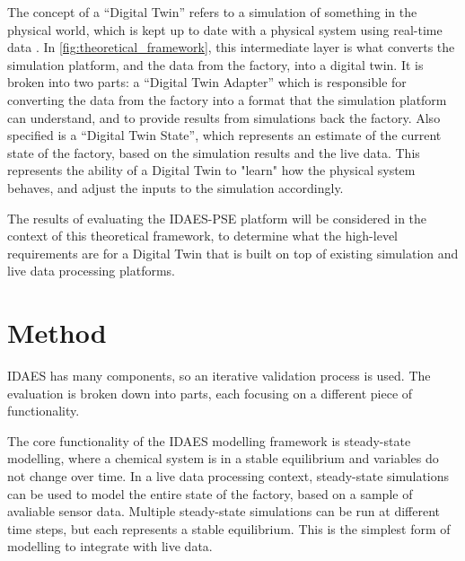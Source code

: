 \documentclass[12pt]{article}
\begin{document}
The concept of a “Digital Twin” refers to a simulation of something in the physical world, which is kept up to date with a physical system using real-time data \cite{yu2022energy}.
In \cref{fig:theoretical_framework}, this intermediate layer is what converts the simulation platform, and the data from the factory, into a digital twin. It is broken into two parts: a ``Digital Twin Adapter'' which is responsible for converting the data from the factory into a format that the simulation platform can understand, and to provide results from simulations back the factory. Also specified is a ``Digital Twin State'', which represents an estimate of the current state of the factory, based on the simulation results and the live data. This represents the ability of a Digital Twin to "learn" how the physical system behaves, and adjust the inputs to the simulation accordingly.

The results of evaluating the IDAES-PSE platform will be considered in the context of this theoretical framework, to determine what the high-level requirements are for a Digital Twin that is built on top of existing simulation and live data processing platforms.


\section{Method}

IDAES has many components, so an iterative validation process is used. The evaluation is broken down into parts, each focusing on a different piece of functionality. 

The core functionality of the IDAES modelling framework is steady-state modelling, where a chemical system is in a stable equilibrium and variables do not change over time. In a live data processing context, steady-state simulations can be used to model the entire state of the factory, based on a sample of avaliable sensor data. Multiple steady-state simulations can be run at different time steps, but each represents a stable equilibrium. This is the simplest form of modelling to integrate with live data. 
\end{document}
